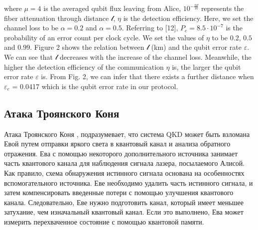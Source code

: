 \documentclass[a4paper,11pt]{article}
\begin{document}
where $\mu = 4$ is the averaged qubit flux leaving from Alice, $10^{- \frac{\alpha \mathcal{l}}{10}}$ represents the fiber attenuation through distance $\mathcal{l}$,
$\eta$ is the detection efficiency. Here, we set the channel loss to be $\alpha = 0.2$ and
$\alpha = 0.5$. Referring to [12], $P_e = 8.5 \cdot 10^{−7}$ is the probability of an error count per clock cycle. We set the values of $\eta$ to be $0.2$, $0.5$ and $0.99$.
Figure 2 shows the relation between $\mathcal{l}$ (km) and the qubit error rate $\varepsilon$. We can see that $\mathcal{l}$ decreases with the increase of the channel loss. Meanwhile, the higher the detection efficiency of the communication $\eta$ is, the larger the qubit error rate $\varepsilon$ is. From Fig. 2, we can infer that there exists a further distance when $\varepsilon_e$ = 0.0417 which is the qubit error rate in our protocol.

\cite{base}


\subsection{Атака Троянского Коня}

Атака Троянского Коня \cite{trojan,trojan2}, подразумевает, что система QKD может быть взломана Евой путем отправки яркого света в квантовый канал и анализа обратного отражения. Ева с помощью некоторого дополнительного источника занимает часть квантового канала для наблюдения сигнала лазера, посылаемого Алисой. Как правило, схема обнаружения истинного сигнала основана на особенностях вспомогательного источника. Еве необходимо удалить часть истинного сигнала, и затем компенсировать введенные потери с помощью улучшения квантового канала. Следовательно, Еве нужно подготовить канал, который имеет меньшее затухание, чем изначальный квантовый канал. Если это выполнено, Ева может измерить перехваченное состояние с помощью квантовой памяти.

\begin{figure}[h]
	\label{ris:image1}
\end{figure}
\end{document}
